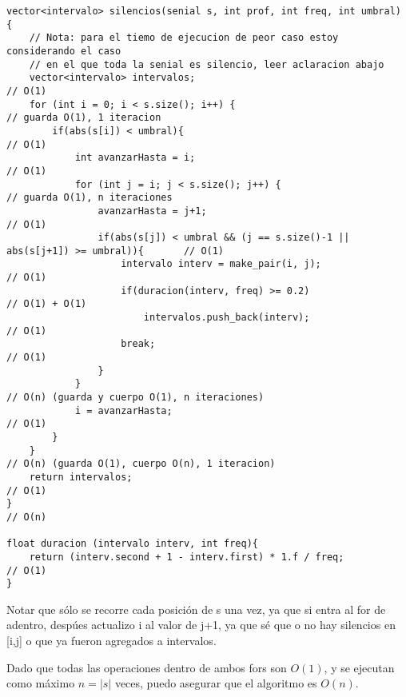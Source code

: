 \documentclass{article}
\begin{document}
\begin{lstlisting}
vector<intervalo> silencios(senial s, int prof, int freq, int umbral) {
    // Nota: para el tiemo de ejecucion de peor caso estoy considerando el caso
    // en el que toda la senial es silencio, leer aclaracion abajo
    vector<intervalo> intervalos;                                                       // O(1)
    for (int i = 0; i < s.size(); i++) {                                                // guarda O(1), 1 iteracion
        if(abs(s[i]) < umbral){                                                         // O(1)
            int avanzarHasta = i;                                                       // O(1)
            for (int j = i; j < s.size(); j++) {                                        // guarda O(1), n iteraciones
                avanzarHasta = j+1;                                                     // O(1)
                if(abs(s[j]) < umbral && (j == s.size()-1 || abs(s[j+1]) >= umbral)){       // O(1)
                    intervalo interv = make_pair(i, j);                                 // O(1)
                    if(duracion(interv, freq) >= 0.2)                                   // O(1) + O(1)
                        intervalos.push_back(interv);                                   // O(1)
                    break;                                                              // O(1)
                }
            }                                                                           // O(n) (guarda y cuerpo O(1), n iteraciones)
            i = avanzarHasta;                                                           // O(1)
        }
    }                                                                                   // O(n) (guarda O(1), cuerpo O(n), 1 iteracion)
    return intervalos;                                                                  // O(1)
}                                                                                       // O(n)

float duracion (intervalo interv, int freq){
    return (interv.second + 1 - interv.first) * 1.f / freq;                             // O(1)
}
\end{lstlisting}

Notar que sólo se recorre cada posición de s una vez, ya que si entra al for de adentro, despúes actualizo i
al valor de j+1, ya que sé que o no hay silencios en [i,j] o que ya fueron agregados a intervalos.

Dado que todas las operaciones dentro de ambos fors son $O(1)$, y se ejecutan como máximo $n=|s|$ veces, puedo
asegurar que el algoritmo es $O(n)$.
\end{document}
